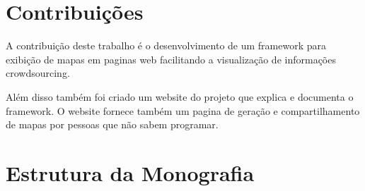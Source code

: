 \section{Contribuições}
A contribuição deste trabalho é o desenvolvimento de um framework para exibição de mapas em paginas web facilitando a visualização de informações crowdsourcing.

Além disso também foi criado um website do projeto\cite{gitsite} que explica e documenta o framework. O website fornece também um pagina de geração e compartilhamento de mapas por pessoas que não sabem programar.

\section{Estrutura da Monografia}
